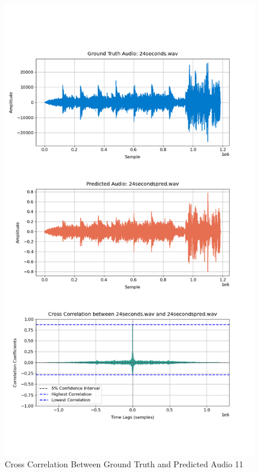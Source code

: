 \documentclass{ioereport}
\begin{document}
    \begin{figure}[H]
        \centering
        \includegraphics[width=\linewidth]{assets/crosscorrelation/cross_correlation_24seconds_24secondspred.png}
        \caption{Cross Correlation Between Ground Truth and Predicted Audio 11}
        \label{fig:cross-correlation-11}
    \end{figure}
\end{document}
